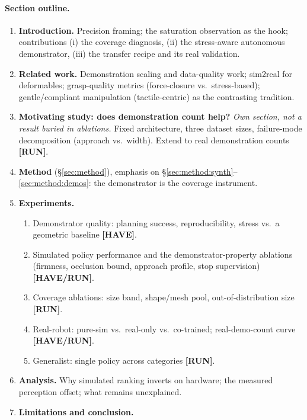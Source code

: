 \paragraph{Section outline.}
\begin{enumerate}
  \item \textbf{Introduction.} Precision framing; the saturation observation as the hook;
        contributions (i) the coverage diagnosis, (ii) the stress-aware autonomous
        demonstrator, (iii) the transfer recipe and its real validation.
  \item \textbf{Related work.} Demonstration scaling and data-quality work; sim2real for
        deformables; grasp-quality metrics (force-closure vs.\ stress-based); gentle/compliant
        manipulation (tactile-centric) as the contrasting tradition.
  \item \textbf{Motivating study: does demonstration count help?} \emph{Own section, not a
        result buried in ablations.} Fixed architecture, three dataset sizes, failure-mode
        decomposition (approach vs.\ width). Extend to real demonstration counts
        \textbf{[RUN]}.
  \item \textbf{Method} (\S\ref{sec:method}), emphasis on
        \S\ref{sec:method:synth}--\ref{sec:method:demos}: the demonstrator is the coverage
        instrument.
  \item \textbf{Experiments.}
    \begin{enumerate}\renewcommand{\labelenumii}{\alph{enumii})}
      \item Demonstrator quality: planning success, reproducibility, stress vs.\ a geometric
            baseline \textbf{[HAVE]}.
      \item Simulated policy performance and the demonstrator-property ablations (firmness,
            occlusion bound, approach profile, stop supervision) \textbf{[HAVE/RUN]}.
      \item Coverage ablations: size band, shape/mesh pool, out-of-distribution size
            \textbf{[RUN]}.
      \item Real-robot: pure-sim vs.\ real-only vs.\ co-trained; real-demo-count curve
            \textbf{[HAVE/RUN]}.
      \item Generalist: single policy across categories \textbf{[RUN]}.
    \end{enumerate}
  \item \textbf{Analysis.} Why simulated ranking inverts on hardware; the measured
        perception offset; what remains unexplained.
  \item \textbf{Limitations and conclusion.}
\end{enumerate}

